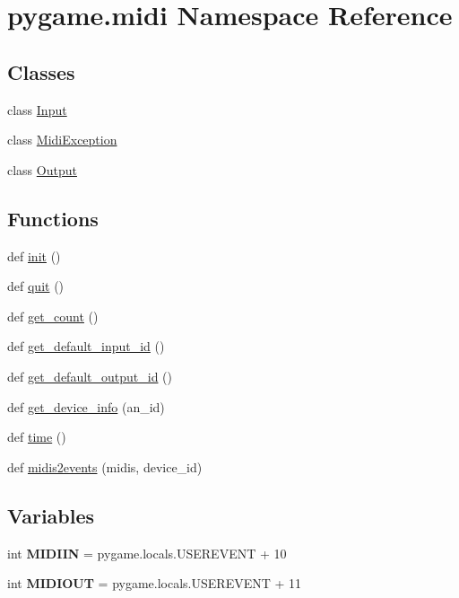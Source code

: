 \hypertarget{namespacepygame_1_1midi}{}\section{pygame.\+midi Namespace Reference}
\label{namespacepygame_1_1midi}
\subsection*{Classes}
\begin{DoxyCompactItemize}
\item 
class \hyperlink{classpygame_1_1midi_1_1_input}{Input}
\item 
class \hyperlink{classpygame_1_1midi_1_1_midi_exception}{Midi\+Exception}
\item 
class \hyperlink{classpygame_1_1midi_1_1_output}{Output}
\end{DoxyCompactItemize}
\subsection*{Functions}
\begin{DoxyCompactItemize}
\item 
def \hyperlink{namespacepygame_1_1midi_a2272bbd4600ff1706570238796d25eb9}{init} ()
\item 
def \hyperlink{namespacepygame_1_1midi_acd13a2df48ba49d2d7b54c41041b5947}{quit} ()
\item 
def \hyperlink{namespacepygame_1_1midi_a1a222467ad7f6c7c51850bc961d56c16}{get\+\_\+count} ()
\item 
def \hyperlink{namespacepygame_1_1midi_a6b730b0fcba359aeb568488d5d23d733}{get\+\_\+default\+\_\+input\+\_\+id} ()
\item 
def \hyperlink{namespacepygame_1_1midi_a29a30630292b83257a9348f3ccea65ae}{get\+\_\+default\+\_\+output\+\_\+id} ()
\item 
def \hyperlink{namespacepygame_1_1midi_a6d4fb40a72cc8d833f4b59076827d963}{get\+\_\+device\+\_\+info} (an\+\_\+id)
\item 
def \hyperlink{namespacepygame_1_1midi_a2f81b7e8c7f654aa21fe687b2a9cc51c}{time} ()
\item 
def \hyperlink{namespacepygame_1_1midi_a7623e211da0629c5520b3b0384445104}{midis2events} (midis, device\+\_\+id)
\end{DoxyCompactItemize}
\subsection*{Variables}
\begin{DoxyCompactItemize}
\item 
\mbox{\label{namespacepygame_1_1midi_a8b89fc8f22e1e3fcd920257221695a0e}} 
int {\bfseries M\+I\+D\+I\+IN} = pygame.\+locals.\+U\+S\+E\+R\+E\+V\+E\+NT + 10
\item 
\mbox{\label{namespacepygame_1_1midi_a96ca76760f324656f2dee60efeee1ec4}} 
int {\bfseries M\+I\+D\+I\+O\+UT} = pygame.\+locals.\+U\+S\+E\+R\+E\+V\+E\+NT + 11
\end{DoxyCompactItemize}


